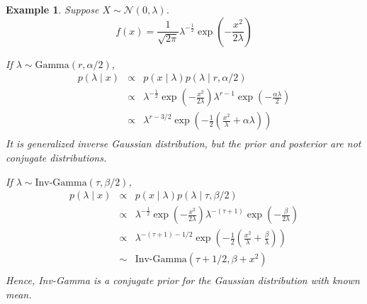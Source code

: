 \documentclass[11pt]{article}
\def\MN{{\mathcal N}}
\newtheorem{example}{Example}[section]
\begin{document}
\begin{example}
Suppose $X\sim \MN(0,\lambda)$.
$$
f(x) = \frac{1}{\sqrt{2\pi}}\lambda^{-\frac{1}{2}}\exp(-\frac{x^2}{2\lambda})
$$

If $\lambda\sim \mbox{Gamma}(r,\alpha/2)$,
\begin{eqnarray*}
p(\lambda\mid x)&\propto& p(x\mid\lambda)p(\lambda\mid r,\alpha/2)\\
&\propto& \lambda^{-\frac{1}{2}}\exp({-\frac{x^2}{2\lambda}})\lambda^{r-1}\exp(-\frac{\alpha\lambda}{2}) \\
&\propto& \lambda^{r-3/2}\exp(-\frac{1}{2}(\frac{x^2}{\lambda}+\alpha\lambda)) \\
\end{eqnarray*}
It is generalized inverse Gaussian distribution, but the prior and posterior are not conjugate distributions. 

If $\lambda\sim \mbox{Inv-Gamma}(\tau,\beta/2)$,
\begin{eqnarray*}
p(\lambda\mid x)&\propto& p(x\mid\lambda)p(\lambda\mid \tau,\beta/2)\\
&\propto& \lambda^{-\frac{1}{2}}\exp({-\frac{x^2}{2\lambda}})\lambda^{-(\tau+1)}\exp(-\frac{\beta}{2\lambda}) \\
&\propto& \lambda^{-(\tau+1)-1/2}\exp(-\frac{1}{2}(\frac{x^2}{\lambda}+\frac{\beta}{\lambda})) \\
&\sim&\mbox{Inv-Gamma}(\tau+1/2,\beta+x^2) \\
\end{eqnarray*}
Hence, Inv-Gamma is a conjugate prior for the Gaussian distribution with known mean.
\end{example}
\end{document}
